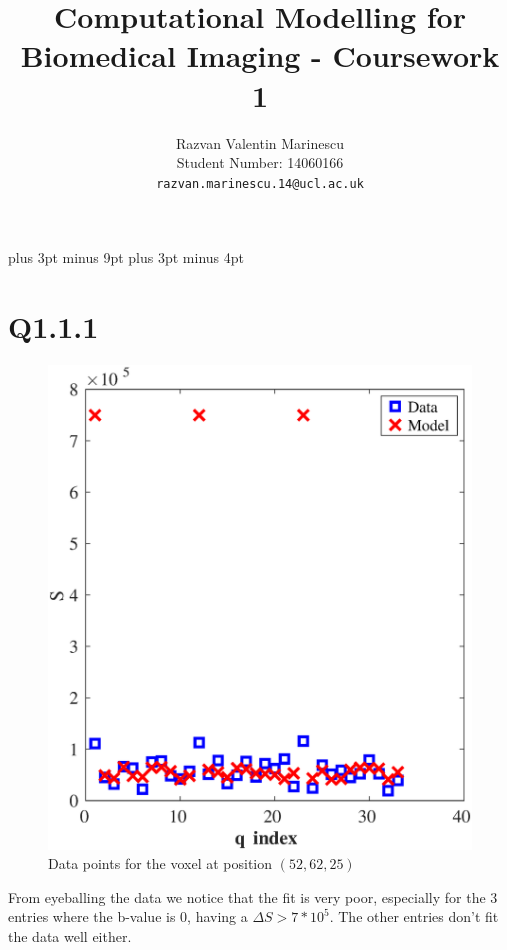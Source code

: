 \documentclass[11pt,a4paper,oneside]{report}
\title{Computational Modelling for Biomedical Imaging - Coursework 1}
\author{
Razvan Valentin Marinescu\\
Student Number: 14060166\\
\texttt{razvan.marinescu.14@ucl.ac.uk}
}
\begin{document}
\belowdisplayskip=12pt plus 3pt minus 9pt
\belowdisplayshortskip=7pt plus 3pt minus 4pt
\maketitle{}

\section*{Q1.1.1}
\begin{figure}[H]
\centering
\includegraphics[scale=0.5]{figures/q111.eps}
\caption{Data points for the voxel at position $(52,62,25)$}
\end{figure}



From eyeballing the data we notice that the fit is very poor, especially for the 3 entries where the b-value is 0, having a $\Delta S > 7 * 10^5$. The other entries don't fit the data well either.
\end{document}
